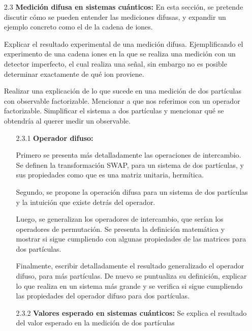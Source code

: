 \documentclass[12pt,oneside]{book}\raggedbottom{} %
\begin{document}
\begin{sloppypar}
{{\begin{itemize}
  \item[2.3]\textbf{{Medición difusa en sistemas cuánticos}:}  En esta sección, se pretende discutir cómo se pueden entender las mediciones difusas, y expandir un ejemplo concreto como el de la cadena de iones.

  Explicar el resultado experimental de una medición difusa. Ejemplificando el  experimento de una cadena iones en la que se  realiza una medición con un detector imperfecto, el cual realiza una señal, sin embargo  no es posible determinar exactamente de qué ion proviene.  

Realizar una explicación de lo que sucede en una medición de dos partículas con observable factorizable. Mencionar a que nos referimos con un operador factorizable. Simplificar el sistema a dos partículas y mencionar qué se obtendría al querer medir un observable.

\begin{itemize}
  \item[2.3.1]\textbf{{Operador difuso}:}
  
  Primero se presenta más detalladamente las operaciones de intercambio. Se definen la transformación SWAP, para un sistema de dos partículas, y sus propiedades como que es una matriz unitaria, hermítica.

  Segundo, se propone la operación difusa para un sistema de dos partículas y la intuición que existe detrás del operador. 

  {Luego, se generalizan los operadores de intercambio, que serían los operadores de permutación. Se presenta  la definición matemática y mostrar si sigue cumpliendo con algunas propiedades de las matrices para dos partículas. }

Finalmente, escribir detalladamente el resultado generalizado el operador difuso, para más partículas. De nuevo se puntualiza su definición, explicar lo que realiza en un sistema más grande y se  verifica si sigue cumpliendo las propiedades del operador difuso para dos partículas.

  \item[2.3.2] \textbf{Valores esperado en sistemas cuánticos:} {Se explica el resultado del valor esperado en la medición de dos partículas }
  
  

\end{itemize}
\end{itemize}}}
\end{sloppypar}
\end{document}
